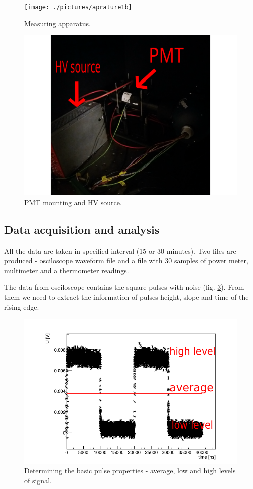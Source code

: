 \begin{figure}[H]
 \centering
 \texttt{[image: ./pictures/aprature1b]}
 \caption{Measuring apparatus.}
 \label{aparature1}
\end{figure}

\begin{figure}[H]
 \centering
 \includegraphics[scale = 0.09]{./pictures/aparature2b}
 \caption{PMT mounting and HV source.}
 \label{aparature2}
\end{figure}


\subsection{Data acquisition and analysis}
All the data are taken in specified interval (15 or 30 minutes). Two files are produced - osciloscope waveform file and a file with 30 samples of power meter, multimeter and a thermometer readings.
\par
The data from osciloscope contains the square pulses with noise (fig. \ref{pulse}). From them we need to extract the information of pulses height, slope and time of the rising edge.

 \begin{figure}[H]
 \centering
 \includegraphics[scale=0.65]{./pictures/PMTPulse}
 \caption{Determining the basic pulse properties - average, low and high levels of signal.}
 \label{pulse}
\end{figure}

